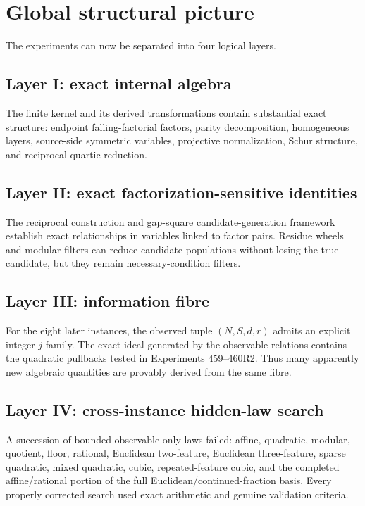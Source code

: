 \documentclass[11pt,a4paper]{article}
\begin{document}
\section{Global structural picture}

The experiments can now be separated into four logical layers.

\subsection{Layer I: exact internal algebra}
The finite kernel and its derived transformations contain substantial exact structure: endpoint falling-factorial factors, parity decomposition, homogeneous layers, source-side symmetric variables, projective normalization, Schur structure, and reciprocal quartic reduction.

\subsection{Layer II: exact factorization-sensitive identities}
The reciprocal construction and gap-square candidate-generation framework establish exact relationships in variables linked to factor pairs. Residue wheels and modular filters can reduce candidate populations without losing the true candidate, but they remain necessary-condition filters.

\subsection{Layer III: information fibre}
For the eight later instances, the observed tuple $(N,S,d,r)$ admits an explicit integer $j$-family. The exact ideal generated by the observable relations contains the quadratic pullbacks tested in Experiments 459--460R2. Thus many apparently new algebraic quantities are provably derived from the same fibre.

\subsection{Layer IV: cross-instance hidden-law search}
A succession of bounded observable-only laws failed: affine, quadratic, modular, quotient, floor, rational, Euclidean two-feature, Euclidean three-feature, sparse quadratic, mixed quadratic, cubic, repeated-feature cubic, and the completed affine/rational portion of the full Euclidean/continued-fraction basis. Every properly corrected search used exact arithmetic and genuine validation criteria.
\end{document}
